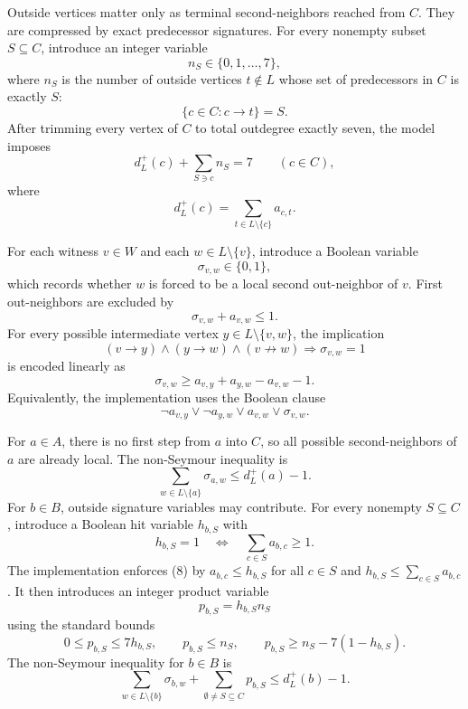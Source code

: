 \documentclass[a4paper,fleqn]{cas-sc}
\theoremstyle{definition}
\begin{document}
Outside vertices matter only as terminal second-neighbors reached from $C$. They are compressed by exact predecessor signatures. For every nonempty subset $S\subseteq C$, introduce an integer variable
\[
n_S\in\{0,1,\ldots,7\},
\]
where $n_S$ is the number of outside vertices $t\notin L$ whose set of predecessors in $C$ is exactly $S$:
\[
\{c\in C:c\to t\}=S.
\]
After trimming every vertex of $C$ to total outdegree exactly seven, the model imposes
\begin{equation}
d_L^+(c)+\sum_{S\ni c}n_S=7\qquad(c\in C),\tag{4}
\end{equation}
where
\[
d_L^+(c)=\sum_{t\in L\setminus\{c\}}a_{c,t}.
\]

For each witness $v\in W$ and each $w\in L\setminus\{v\}$, introduce a Boolean variable
\[
\sigma_{v,w}\in\{0,1\},
\]
which records whether $w$ is forced to be a local second out-neighbor of $v$. First out-neighbors are excluded by
\begin{equation}
\sigma_{v,w}+a_{v,w}\le 1.\tag{5}
\end{equation}
For every possible intermediate vertex $y\in L\setminus\{v,w\}$, the implication
\[
(v\to y)\wedge(y\to w)\wedge(v\not\to w)\Longrightarrow \sigma_{v,w}=1
\]
is encoded linearly as
\begin{equation}
\sigma_{v,w}\ge a_{v,y}+a_{y,w}-a_{v,w}-1.\tag{6}
\end{equation}
Equivalently, the implementation uses the Boolean clause
\[
\neg a_{v,y}\vee \neg a_{y,w}\vee a_{v,w}\vee \sigma_{v,w}.
\]

For $a\in A$, there is no first step from $a$ into $C$, so all possible second-neighbors of $a$ are already local. The non-Seymour inequality is
\begin{equation}
\sum_{w\in L\setminus\{a\}}\sigma_{a,w}
\le d_L^+(a)-1.
\tag{7}
\end{equation}
For $b\in B$, outside signature variables may contribute. For every nonempty $S\subseteq C$, introduce a Boolean hit variable $h_{b,S}$ with
\begin{equation}
h_{b,S}=1\quad\Longleftrightarrow\quad \sum_{c\in S}a_{b,c}\ge 1.
\tag{8}
\end{equation}
The implementation enforces (8) by $a_{b,c}\le h_{b,S}$ for all $c\in S$ and $h_{b,S}\le \sum_{c\in S}a_{b,c}$. It then introduces an integer product variable
\[
p_{b,S}=h_{b,S}n_S
\]
using the standard bounds
\[
0\le p_{b,S}\le 7h_{b,S},\qquad p_{b,S}\le n_S,
\qquad p_{b,S}\ge n_S-7(1-h_{b,S}).
\]
The non-Seymour inequality for $b\in B$ is
\begin{equation}
\sum_{w\in L\setminus\{b\}}\sigma_{b,w}
+\sum_{\emptyset\ne S\subseteq C}p_{b,S}
\le d_L^+(b)-1.
\tag{9}
\end{equation}
\end{document}

